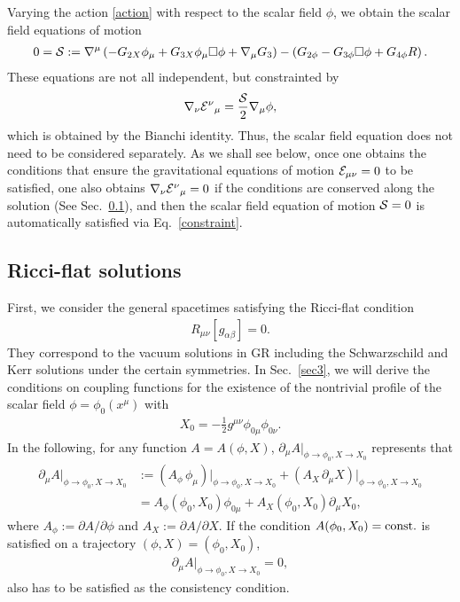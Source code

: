 \documentclass[prd,amsmath,amssymb,floatfix,superscriptaddress,notitlepage,nofootinbib,preprintnumbers]{revtex4-1}
\begin{document}
Varying the action \eqref{action} with respect to the scalar field $\phi$,
we obtain the scalar field equations of motion 
\begin{align}
\label{sca}
0={\cal S}
:=
\nabla^\mu
\left(
 -G_{2X}\phi_\mu 
 +G_{3X}\phi_\mu\Box\phi 
+\nabla_\mu G_3
\right)
- \left(
  G_{2\phi}
- G_{3\phi}\Box\phi
+G_{4\phi}R  
\right).
\end{align}
These equations are not all independent, but constrainted by 
\begin{align}
\label{constraint}
\nabla_\nu {\cal E}^\nu{}_\mu= \frac{\cal S}{2}\nabla_\mu \phi,
\end{align}
which is obtained by
the Bianchi identity.
Thus, the scalar field equation does not need to be considered separately.
As we shall see below,
once one obtains the conditions that ensure
the gravitational equations of motion ${\cal E}_{\mu\nu}=0$
to be satisfied,
one also obtains $\nabla_\nu {\cal E}^{\nu}{}_{\mu}=0$
if the conditions are conserved along the solution
(See Sec.~\ref{sec22}),
and then 
the scalar field equation of motion ${\cal S}=0$ is automatically satisfied
via Eq.~\eqref{constraint}.



\subsection{Ricci-flat solutions}
\label{sec22}

First, 
we consider the general spacetimes satisfying the Ricci-flat condition
\begin{align}
\label{ricci}
R_{\mu\nu}[g_{\alpha\beta}]=0.
\end{align}
They correspond to the vacuum solutions in GR
including the Schwarzschild and Kerr solutions under the certain symmetries.
In Sec.~\ref{sec3},
we will derive the conditions
on coupling functions
for the existence of the nontrivial profile of the scalar field $\phi=\phi_0(x^\mu)$
with 
\begin{align}
X_0=-\frac{1}{2}g^{\mu\nu}\phi_{0\mu}\phi_{0\nu}.
\end{align}
In the following, for any function $A=A(\phi,X)$,
$\partial_\mu A |_{\phi\to \phi_0,X\to X_0}$
represents that
\begin{align}
 \partial_\mu A\Big|_{\phi\to \phi_0,X\to X_0}
&:=
\left(A_{\phi}\,  \phi_{\mu}\right)\Big|_{\phi\to \phi_0, X\to X_0}
+
\left(A_{X} \, \partial_\mu X\right)\Big|_{\phi\to \phi_0, X\to X_0}
\nonumber\\
&=
A_{\phi} (\phi_0,X_0) \phi_{0\mu}
+A_{X} (\phi_0,X_0) \partial_\mu X_0,
\end{align}
where 
$A_\phi:=\partial A/\partial \phi$
and 
$A_X:=\partial A/\partial X$.
If the condition $A(\phi_0, X_0)={\rm const.}$
is satisfied on a trajectory $(\phi,X)=(\phi_0,X_0)$,
\begin{align}
\label{naba} 
\partial_\mu A\Big |_{\phi\to \phi_0,X\to X_0}=0,
\end{align}
also has to be satisfied as the consistency condition.
\end{document}

